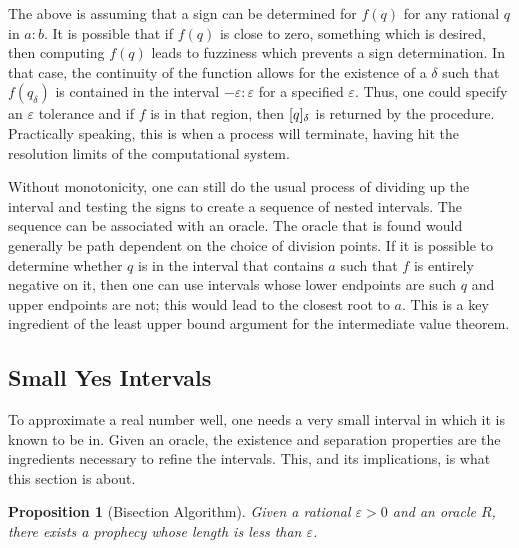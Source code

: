 \documentclass[12pt]{article}
\newtheorem{proposition}{Proposition}[section]
\begin{document}
The above is assuming that a sign can be determined for $f(q)$ for any rational $q$ in $a:b$. It is possible that if $f(q)$ is close to zero, something which is desired, then computing $f(q)$ leads to fuzziness which prevents a sign determination. In that case, the continuity of the function allows for the existence of a $\delta$ such that $f(q_{\delta})$ is contained in the interval $-\varepsilon:\varepsilon$ for a specified $\varepsilon$. Thus, one could specify an $\varepsilon$ tolerance and if $f$ is in that region, then $[q]_{\delta}$ is returned by the procedure. Practically speaking, this is when a process will terminate, having hit the resolution limits of the computational system. 

Without monotonicity, one can still do the usual process of dividing up the interval and testing the signs to create a sequence of nested intervals. The sequence can be associated with an oracle. The oracle that is found would generally be path dependent on the choice of division points. If it is possible to determine whether $q$ is in the interval that contains $a$ such that $f$ is entirely negative on it, then one can use intervals whose lower endpoints are such $q$ and upper endpoints are not; this would lead to the closest root to $a$. This is a key ingredient of the least upper bound argument for the intermediate value theorem. 

\subsection{Small Yes Intervals}

To approximate a real number well, one needs a very small interval in which it is known to be in. Given an oracle, the existence and separation properties are the ingredients necessary to refine the intervals. This, and its implications, is what this section is about. 


\begin{proposition}[Bisection Algorithm]
    Given a rational $\varepsilon >0$ and an oracle $R$, there exists a prophecy whose length is less than $\varepsilon$.
\end{proposition}
\end{document}
